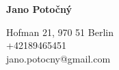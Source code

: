 \documentclass[12pt, a4paper]{article}
\begin{document}
        \begin{center} \huge \bfseries Jano Potočný\end{center}
Hofman 21, 970 51 Berlin\\
+42189465451\\
jano.potocny@gmail.com\\
\end{document}
